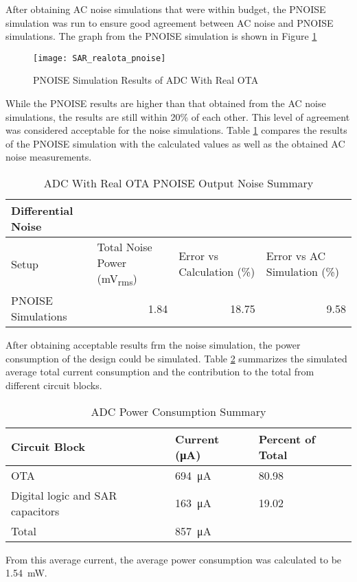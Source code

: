 After obtaining AC noise simulations that were within budget, the PNOISE simulation was run to ensure good agreement between AC noise and PNOISE simulations. The graph from the PNOISE simulation is shown in Figure \ref{fig:pnoiserealota}
\begin{figure}[htbp]
\centering
\texttt{[image: SAR\_realota\_pnoise]}
\caption{PNOISE Simulation Results of ADC With Real OTA } 
\label{fig:pnoiserealota}
\end{figure}
While the PNOISE results are higher than that obtained from the AC noise simulations, the results are still within 20\% of each other. This level of agreement was considered acceptable for the noise simulations. Table \ref{tab:pnoisesummaryrealota} compares the results of the PNOISE simulation with the calculated values as well as the obtained AC noise measurements.
\begin{table}[htbp]
\begin{center}
\begin{tabularx}{\linewidth}{|l|X|X|X|}
\hline
Differential Noise &  &  &  \\ \hline
Setup & Total Noise Power (\si{\milli\volt_{rms}}) & Error vs Calculation (\%) & Error vs AC Simulation (\%) \\ \hline
PNOISE Simulations & \multicolumn{1}{r|}{1.84} & \multicolumn{1}{r|}{18.75} & \multicolumn{1}{r|}{9.58} \\ \hline
\end{tabularx}
\caption{ADC With Real OTA PNOISE Output Noise Summary}
\label{tab:pnoisesummaryrealota}
\end{center}
\end{table}

After obtaining acceptable results frm the noise simulation, the power consumption of the design could be simulated. Table \ref{tab:powerconsumptionrealota} summarizes the simulated average total current consumption and the contribution to the total from different circuit blocks.
\begin{table}[htbp]
\begin{center}
\begin{tabular}{|l|l|l|}
\hline
Circuit Block & Current (\si{\micro\ampere}) & Percent of Total \\ \hline
OTA & \SI{694}{\micro\ampere} & {80.98} \\ \hline
Digital logic and SAR capacitors & \SI{163}{\micro\ampere} & {19.02} \\ \hline
Total & \SI{857}{\micro\ampere} &  \\ \hline
\end{tabular}
\end{center}
\caption{ADC Power Consumption Summary}
\label{tab:powerconsumptionrealota}
\end{table}
From this average current, the average power consumption was calculated to be \SI{1.54}{\milli\watt}. 

